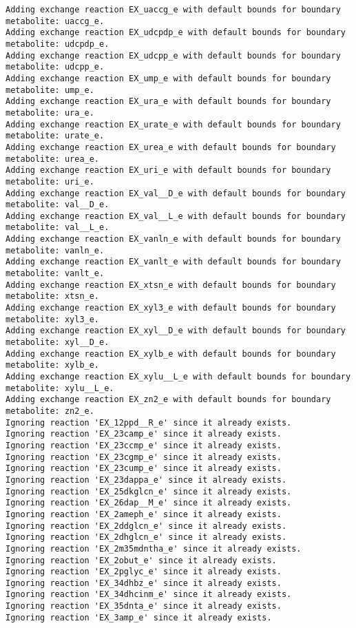 \documentclass[
  letterpaper,
  DIV=11,
  numbers=noendperiod]{scrartcl}
\begin{document}
\begin{verbatim}
Adding exchange reaction EX_uaccg_e with default bounds for boundary metabolite: uaccg_e.
Adding exchange reaction EX_udcpdp_e with default bounds for boundary metabolite: udcpdp_e.
Adding exchange reaction EX_udcpp_e with default bounds for boundary metabolite: udcpp_e.
Adding exchange reaction EX_ump_e with default bounds for boundary metabolite: ump_e.
Adding exchange reaction EX_ura_e with default bounds for boundary metabolite: ura_e.
Adding exchange reaction EX_urate_e with default bounds for boundary metabolite: urate_e.
Adding exchange reaction EX_urea_e with default bounds for boundary metabolite: urea_e.
Adding exchange reaction EX_uri_e with default bounds for boundary metabolite: uri_e.
Adding exchange reaction EX_val__D_e with default bounds for boundary metabolite: val__D_e.
Adding exchange reaction EX_val__L_e with default bounds for boundary metabolite: val__L_e.
Adding exchange reaction EX_vanln_e with default bounds for boundary metabolite: vanln_e.
Adding exchange reaction EX_vanlt_e with default bounds for boundary metabolite: vanlt_e.
Adding exchange reaction EX_xtsn_e with default bounds for boundary metabolite: xtsn_e.
Adding exchange reaction EX_xyl3_e with default bounds for boundary metabolite: xyl3_e.
Adding exchange reaction EX_xyl__D_e with default bounds for boundary metabolite: xyl__D_e.
Adding exchange reaction EX_xylb_e with default bounds for boundary metabolite: xylb_e.
Adding exchange reaction EX_xylu__L_e with default bounds for boundary metabolite: xylu__L_e.
Adding exchange reaction EX_zn2_e with default bounds for boundary metabolite: zn2_e.
Ignoring reaction 'EX_12ppd__R_e' since it already exists.
Ignoring reaction 'EX_23camp_e' since it already exists.
Ignoring reaction 'EX_23ccmp_e' since it already exists.
Ignoring reaction 'EX_23cgmp_e' since it already exists.
Ignoring reaction 'EX_23cump_e' since it already exists.
Ignoring reaction 'EX_23dappa_e' since it already exists.
Ignoring reaction 'EX_25dkglcn_e' since it already exists.
Ignoring reaction 'EX_26dap__M_e' since it already exists.
Ignoring reaction 'EX_2ameph_e' since it already exists.
Ignoring reaction 'EX_2ddglcn_e' since it already exists.
Ignoring reaction 'EX_2dhglcn_e' since it already exists.
Ignoring reaction 'EX_2m35mdntha_e' since it already exists.
Ignoring reaction 'EX_2obut_e' since it already exists.
Ignoring reaction 'EX_2pglyc_e' since it already exists.
Ignoring reaction 'EX_34dhbz_e' since it already exists.
Ignoring reaction 'EX_34dhcinm_e' since it already exists.
Ignoring reaction 'EX_35dnta_e' since it already exists.
Ignoring reaction 'EX_3amp_e' since it already exists.

\end{verbatim}
\end{document}
